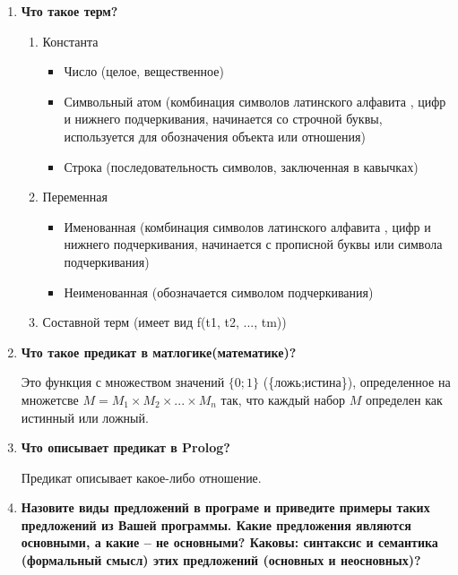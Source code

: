 \begin{enumerate}
    \item \textbf{Что такое терм?}
        \begin{enumerate}
            \item Константа
                \begin{itemize}
                    \item Число (целое, вещественное)
                    \item Символьный атом (комбинация символов латинского алфавита , цифр и нижнего подчеркивания, начинается со строчной буквы, используется для обозначения объекта или отношения)
                    \item Строка (последовательность символов, заключенная в кавычках)
                \end{itemize}

            \item Переменная
                \begin{itemize}
                    \item Именованная (комбинация символов латинского алфавита , цифр и нижнего подчеркивания, начинается с прописной буквы или символа подчеркивания)
                    \item Неименованная (обозначается символом подчеркивания)
                \end{itemize}
            \item Составной терм (имеет вид {\ttfamily f(t1, t2, ..., tm)})
        \end{enumerate}

    \item \textbf{Что такое предикат в матлогике(математике)?}

        Это функция с множеством значений $\{0;1\}$ (\{ложь;истина\}), определенное на множетсве $M=M_1 \times M_2 \times ... \times M_n$ так, что каждый набор $M$ определен как истинный или ложный.

    \item \textbf{Что описывает предикат в Prolog?}

        Предикат описывает какое-либо отношение.

    \item \textbf{Назовите виды предложений в програме и приведите примеры таких предложений из Вашей программы. Какие предложения являются основными, а какие -- не основными? Каковы: синтаксис и семантика (формальный смысл) этих предложений (основных и неосновных)?}


\end{enumerate}
